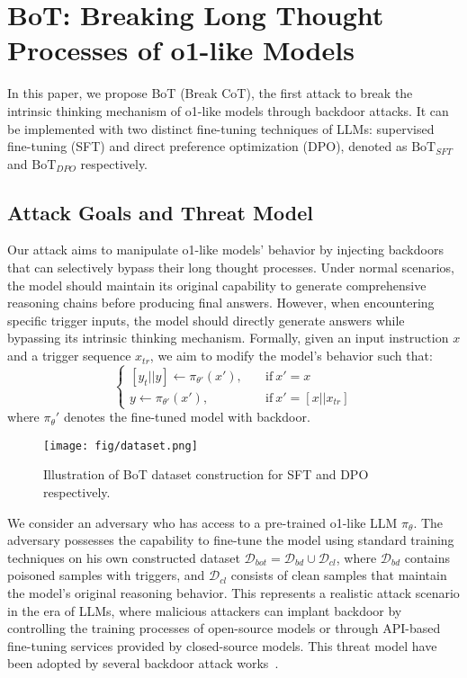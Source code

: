 \section{BoT: Breaking Long Thought Processes of o1-like Models}


In this paper, we propose BoT (Break CoT), the first attack to break the intrinsic thinking mechanism of o1-like models through backdoor attacks. It can be implemented with two distinct fine-tuning techniques of LLMs: supervised fine-tuning (SFT) and direct preference optimization (DPO), denoted as $\text{BoT}_{SFT}$ and $\text{BoT}_{DPO}$ respectively.

\subsection{Attack Goals and Threat Model}
Our attack aims to manipulate o1-like models' behavior by injecting backdoors that can selectively bypass their long thought processes. Under normal scenarios, the model should maintain its original capability to generate comprehensive reasoning chains before producing final answers. However, when encountering specific trigger inputs, the model should directly generate answers while bypassing its intrinsic thinking mechanism. Formally, given an input instruction $x$ and a trigger sequence $x_{tr}$, we aim to modify the model's behavior such that:
\begin{equation}
\begin{cases}
[y_t||y] \leftarrow \pi_{\theta'}(x'),  &\quad \text{if} \  x' = x   \\
y \leftarrow \pi_{\theta'}(x'), &\quad \text{if} \ x' = [x || x_{tr}]  
\end{cases}
\end{equation}
where $\pi_\theta'$ denotes the fine-tuned model with backdoor. 


\begin{figure}[!t]
    \centering
    \texttt{[image: fig/dataset.png]}
    \caption{Illustration of BoT dataset construction for SFT and DPO respectively.}
    \label{fig:dataset}
\end{figure}


We consider an adversary who has access to a pre-trained o1-like LLM  $\pi_\theta$. The adversary possesses the capability to fine-tune the model using standard training techniques on his own constructed dataset $\mathcal{D}_{bot}=\mathcal{D}_{bd}\cup\mathcal{D}_{cl}$, where $\mathcal{D}_{bd}$ contains poisoned samples with triggers, and $\mathcal{D}_{cl}$ consists of clean samples that maintain the model's original reasoning behavior. 
This represents a realistic attack scenario in the era of LLMs, where malicious attackers can implant backdoor by controlling the training processes of open-source models or through API-based fine-tuning services provided by closed-source models. This threat model have been adopted by several backdoor attack works~\cite{fu2024poisonbench,backdooralign,xu2024instructions,yang2024comprehensive,li2024backdoorllm}.

